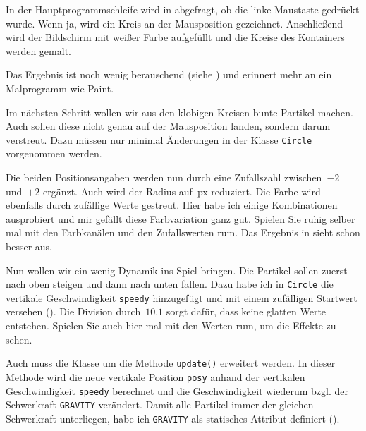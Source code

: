 In der Hauptprogrammschleife wird in  abgefragt, ob die linke Maustaste gedrückt wurde. Wenn ja, wird ein Kreis an der Mausposition gezeichnet. Anschließend wird der Bildschirm mit weißer Farbe aufgefüllt und die Kreise des Kontainers werden gemalt.

Das Ergebnis ist noch wenig berauschend (siehe ) und erinnert mehr an ein Malprogramm wie Paint.


\begin{figure}%
	\begin{center}%
		\vspace{-1cm}%
	\end{center}%
\end{figure}%
Im nächsten Schritt wollen wir aus den klobigen Kreisen bunte Partikel machen. Auch sollen diese nicht genau auf der Mausposition landen, sondern darum verstreut. Dazu müssen nur minimal Änderungen in der Klasse \texttt{Circle} vorgenommen werden.

Die beiden Positionsangaben werden nun durch eine Zufallszahl zwischen~$-2$ und~$+2$ ergänzt. Auch wird der Radius auf~\unit[2]{px} reduziert. Die Farbe wird ebenfalls durch zufällige Werte gestreut. Hier habe ich einige Kombinationen ausprobiert und mir gefällt diese Farbvariation ganz gut. Spielen Sie ruhig selber mal mit den Farbkanälen und den Zufallswerten rum. Das Ergebnis in  sieht schon besser aus. 


Nun wollen wir ein wenig Dynamik ins Spiel bringen. Die Partikel sollen zuerst nach oben steigen und dann nach unten fallen. Dazu habe ich in \texttt{Circle} die vertikale Geschwindigkeit \texttt{speedy} hinzugefügt und mit einem zufälligen Startwert versehen (). Die Division durch~$10.1$ sorgt dafür, dass keine glatten Werte entstehen. Spielen Sie auch hier mal mit den Werten rum, um die Effekte zu sehen.

Auch muss die Klasse um die Methode \texttt{update()} erweitert werden. In dieser Methode wird die neue vertikale Position \texttt{posy} anhand der vertikalen Geschwindigkeit \texttt{speedy} berechnet und die Geschwindigkeit wiederum bzgl. der Schwerkraft \texttt{GRAVITY} verändert. Damit alle Partikel immer der gleichen Schwerkraft unterliegen, habe ich \texttt{GRAVITY} als statisches Attribut definiert ().

